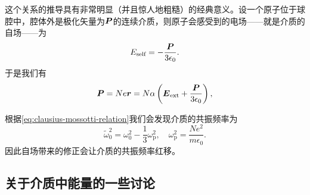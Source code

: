 这个关系的推导具有非常明显（并且惊人地粗糙）的经典意义。设一个原子位于球腔中，腔体外是极化矢量为$\vb*{P}$的连续介质，则原子会感受到的电场——就是介质的自场——为
\[
    E_\text{self} = - \frac{\vb*{P}}{3 \epsilon_0}.
\]
于是我们有
\[
    \vb*{P} = N e \vb*{r} = N \alpha \left( \vb*{E}_\text{ext} + \frac{\vb*{P}}{3 \epsilon_0} \right),
\]

根据\eqref{eq:clausius-mossotti-relation}我们会发现介质的共振频率为
\begin{equation}
    \tilde{\omega}_0^2 = \omega_0^2 - \frac{1}{3} \omega_\text{p}^2, \quad \omega_\text{p}^2 = \frac{N e^2}{m \epsilon_0}.
\end{equation}
因此自场带来的修正会让介质的共振频率红移。

\subsection{关于介质中能量的一些讨论}\label{sec:medium-energy-lagrangian}

